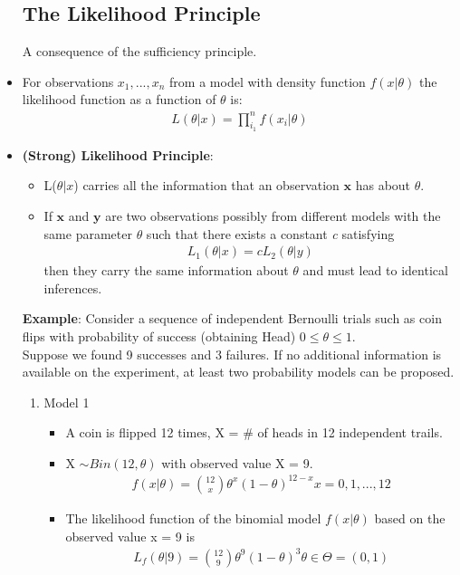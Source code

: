 \documentclass[12pt, oneside]{article}
\newcommand*{\bx}{\bm{x}}
\newcommand*{\by}{\bm{y}}
\begin{document}
\begin{itemize}
 
 
 \subsection{The Likelihood Principle}
 A consequence of the sufficiency principle. 
 \item For observations $x_1,...,x_n$ from a model with density function $f(x|\theta)$ the likelihood function as a function of $\theta$ is:
 \begin{align*}
     L(\theta|x) = \prod_{i_1}^n f(x_i|\theta)
 \end{align*}
 
 \item \textbf{(Strong) Likelihood Principle}: 
 \begin{itemize}
     \item L($\theta|x$) carries all the information that an observation $\bx$ has about $\theta$.
     \item If $\bx$ and $\by$ are two observations possibly from different models with the same parameter $\theta$ such that there exists a constant \emph{c} satisfying
     \begin{align*}
         L_1(\theta|x) = cL_2(\theta|y)
     \end{align*}
     then they carry the same information about $\theta$ and must lead to identical inferences.
 \end{itemize}

 \textbf{Example}: Consider a sequence of independent Bernoulli trials such as coin flips with probability of success (obtaining Head) $0 \leq \theta \leq 1$. \\
 Suppose we found 9 successes and 3 failures. If no additional information is available on the experiment, at least two probability models can be proposed.
 
 \begin{enumerate}
 \item Model 1
    \begin{itemize}
        \item A coin is flipped 12 times, X = \# of heads in 12 independent trails. 
         \item X $\sim Bin(12, \theta)$ with observed value X = 9.
         \begin{align*}
             f(x|\theta) = \binom{12}{x} \theta^x (1-\theta)^{12-x} x = 0,1,...,12
         \end{align*}
         \item The likelihood function of the binomial model $f(x|\theta)$ based on the observed value x = 9 is
         \begin{align*}
             L_f(\theta|9) =\binom{12}{9} \theta^9 (1-\theta)^{3} \theta \in \Theta = (0,1)
         \end{align*}
    \end{itemize}
    

\end{enumerate}
\end{itemize}
\end{document}
